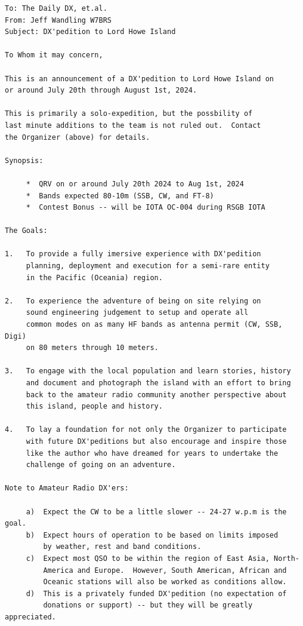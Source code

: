 \documentclass[11pt]{article}
\begin{document}
\begin{Verbatim}[fontsize=\small]
To: The Daily DX, et.al.
From: Jeff Wandling W7BRS
Subject: DX'pedition to Lord Howe Island

To Whom it may concern,

This is an announcement of a DX'pedition to Lord Howe Island on 
or around July 20th through August 1st, 2024.

This is primarily a solo-expedition, but the possbility of
last minute additions to the team is not ruled out.  Contact
the Organizer (above) for details.

Synopsis:

     *  QRV on or around July 20th 2024 to Aug 1st, 2024
     *  Bands expected 80-10m (SSB, CW, and FT-8)
     *  Contest Bonus -- will be IOTA OC-004 during RSGB IOTA

The Goals:

1.   To provide a fully imersive experience with DX'pedition
     planning, deployment and execution for a semi-rare entity
     in the Pacific (Oceania) region.

2.   To experience the adventure of being on site relying on
     sound engineering judgement to setup and operate all
     common modes on as many HF bands as antenna permit (CW, SSB, Digi)
     on 80 meters through 10 meters.

3.   To engage with the local population and learn stories, history
     and document and photograph the island with an effort to bring
     back to the amateur radio community another perspective about
     this island, people and history.

4.   To lay a foundation for not only the Organizer to participate
     with future DX'peditions but also encourage and inspire those
     like the author who have dreamed for years to undertake the
     challenge of going on an adventure.

Note to Amateur Radio DX'ers:

     a)  Expect the CW to be a little slower -- 24-27 w.p.m is the goal.
     b)  Expect hours of operation to be based on limits imposed
         by weather, rest and band conditions.
     c)  Expect most QSO to be within the region of East Asia, North-
         America and Europe.  However, South American, African and
         Oceanic stations will also be worked as conditions allow.
     d)  This is a privately funded DX'pedition (no expectation of
         donations or support) -- but they will be greatly appreciated.


\end{Verbatim}
\end{document}
